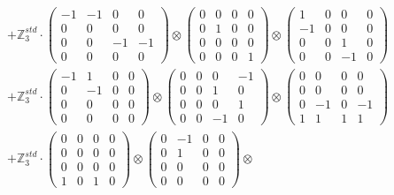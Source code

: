 \documentclass{article}
\begin{document}
{\begin{align}
        &+ \label{Rs1-Rc16-Solution-1-c12} \mathbb{Z}_3^{std} \cdot 
            \begin{pmatrix} -1 & -1 & 0 & 0 \\ 0 & 0 & 0 & 0 \\ 0 & 0 & -1 & -1 \\ 0 & 0 & 0 & 0 \end{pmatrix} \otimes 
            \begin{pmatrix} 0 & 0 & 0 & 0 \\ 0 & 1 & 0 & 0 \\ 0 & 0 & 0 & 0 \\ 0 & 0 & 0 & 1 \end{pmatrix} \otimes 
            \begin{pmatrix} 1 & 0 & 0 & 0 \\ -1 & 0 & 0 & 0 \\ 0 & 0 & 1 & 0 \\ 0 & 0 & -1 & 0 \end{pmatrix} \\ 
        &+ \label{Rs1-Rc16-Solution-1-c13} \mathbb{Z}_3^{std} \cdot 
            \begin{pmatrix} -1 & 1 & 0 & 0 \\ 0 & -1 & 0 & 0 \\ 0 & 0 & 0 & 0 \\ 0 & 0 & 0 & 0 \end{pmatrix} \otimes 
            \begin{pmatrix} 0 & 0 & 0 & -1 \\ 0 & 0 & 1 & 0 \\ 0 & 0 & 0 & 1 \\ 0 & 0 & -1 & 0 \end{pmatrix} \otimes 
            \begin{pmatrix} 0 & 0 & 0 & 0 \\ 0 & 0 & 0 & 0 \\ 0 & -1 & 0 & -1 \\ 1 & 1 & 1 & 1 \end{pmatrix} \\ 
        &+ \label{Rs1-Rc16-Solution-1-c14} \mathbb{Z}_3^{std} \cdot 
            \begin{pmatrix} 0 & 0 & 0 & 0 \\ 0 & 0 & 0 & 0 \\ 0 & 0 & 0 & 0 \\ 1 & 0 & 1 & 0 \end{pmatrix} \otimes 
            \begin{pmatrix} 0 & -1 & 0 & 0 \\ 0 & 1 & 0 & 0 \\ 0 & 0 & 0 & 0 \\ 0 & 0 & 0 & 0 \end{pmatrix} \otimes 

\end{align}}
\end{document}
